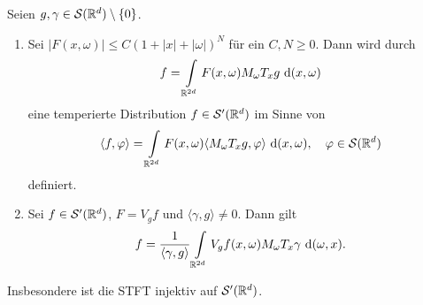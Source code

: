 \begin{sz}
	Seien $ g, \gamma \in \mathcal{S}(\mathbb{R}^d) \setminus \{0\} $.
	\begin{enumerate}[label =\textbf{(\roman*)}]
		\item 
		Sei $ |F(x,\omega)| \leq C (1+|x| + |\omega|)^N $ für ein $ C,N \geq 0 $.
		Dann wird durch 
		\begin{align}
		f 
		=
		\int \limits_{\mathbb{R}^{2d}}
		F(x,\omega) M_\omega T_x g \text{ d} (x,\omega)
		\end{align}
		eine temperierte Distribution $ f \in \mathcal{S}^\prime(\mathbb{R}^d) $ im Sinne von 
		\begin{align}
		\langle f, \varphi \rangle
		= 
		\int \limits_{\mathbb{R}^{2d}}
		F(x,\omega)  \langle M_\omega T_x g , \varphi\rangle \text{ d} (x,\omega), \quad \varphi \in \mathcal{S}(\mathbb{R}^d)
		\end{align}
		definiert.
		\item
		Sei $ f \in \mathcal{S}^\prime(\mathbb{R}^d) $, $ F = V_g f $ und $ \langle \gamma, g \rangle \neq 0 $. Dann gilt
		\begin{align}\label{eq:inverse_STFT_distribution}
		f = \frac{1}{\langle \gamma, g \rangle}\int \limits_{\mathbb{R}^{2d}}  V_g f(x,\omega) M_\omega T_x \gamma  \text{ d} (\omega,x).
		\end{align}
		\end{enumerate}
	Insbesondere ist die STFT injektiv auf $ \mathcal{S}^\prime(\mathbb{R}^d) $.
\end{sz}
